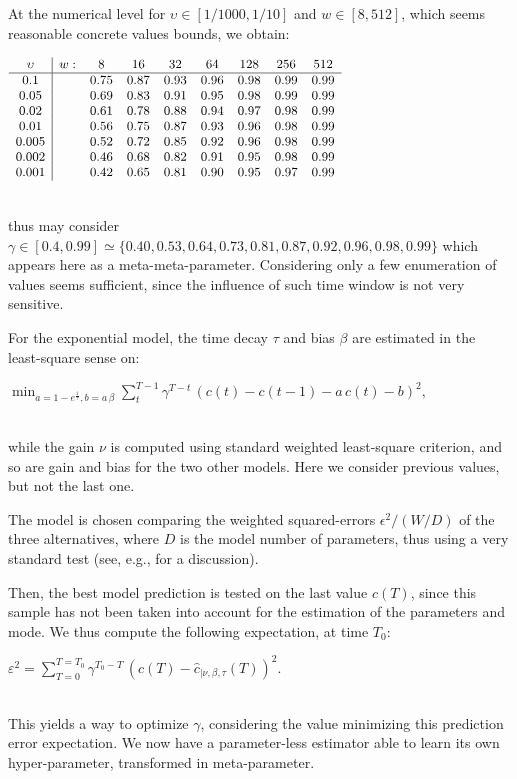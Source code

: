 \documentclass{article}
\newcommand{\eqline}[1]{\\\centerline{$#1$}\\}
\begin{document}
At the numerical level for $\upsilon \in [1/1000, 1/10]$ and $w \in [8, 512]$, which seems reasonable concrete values bounds, we obtain:
\eqline{\small \begin{array}{c|cccccccc} \upsilon & w: &8&16&32&64&128&256&512\\ 
  \hline
   0.1&& 0.75& 0.87& 0.93 & 0.96& 0.98& 0.99& 0.99\\ 
  0.05&& 0.69& 0.83& 0.91& 0.95& 0.98& 0.99& 0.99\\ 
  0.02&& 0.61& 0.78& 0.88& 0.94& 0.97& 0.98& 0.99\\ 
  0.01&& 0.56& 0.75& 0.87& 0.93& 0.96& 0.98& 0.99\\ 
 0.005&& 0.52& 0.72& 0.85& 0.92& 0.96& 0.98& 0.99\\ 
 0.002&& 0.46& 0.68& 0.82& 0.91& 0.95& 0.98& 0.99\\ 
 0.001&& 0.42& 0.65& 0.81& 0.90& 0.95& 0.97& 0.99\\
\end {array}}
thus may consider $\gamma \in [0.4, 0.99] \simeq \{0.40,  0.53,  0.64,  0.73, 0.81,  0.87,  0.92,  0.96,  0.98,  0.99\}$ 
which appears here as a meta-meta-parameter. Considering only a few enumeration of values seems sufficient, since the influence of such time window is not very sensitive.

For the exponential model, the time decay $\tau$ and bias $\beta$ are estimated in the least-square sense on:
\eqline{\min_{a = 1 - e^{\frac{1}{\tau}}, b = a \, \beta} \sum_{t}^{T-1} \gamma^{T-t} \, (c(t) - c(t-1) - a \, c(t) - b)^2,}
while the gain $\nu$ is computed using standard weighted least-square criterion, and so are gain and bias for the two other models. Here we consider previous values, but not the last one.

The model is chosen comparing the weighted squared-errors $\epsilon^2 / (W/D)$ of the three alternatives, where $D$ is the model number of parameters, thus using a very standard test (see, e.g., \cite{vieville:inria-00000172} for a discussion).

Then, the best model prediction is tested on the last value $c(T)$, since this sample has not been taken into account for the estimation of the parameters and mode. We thus compute the following expectation, at time $T_0$:
\eqline{\varepsilon^2 = \sum_{T=0}^{T=T_0} \gamma^{T_0-T} \,  (c(T) - \hat{c}_{|\nu,\beta,\tau}(T))^2.}
This yields a way to optimize $\gamma$, considering the value minimizing this prediction error expectation. We now have a parameter-less estimator able to learn its own hyper-parameter, transformed in meta-parameter.
\end{document}
